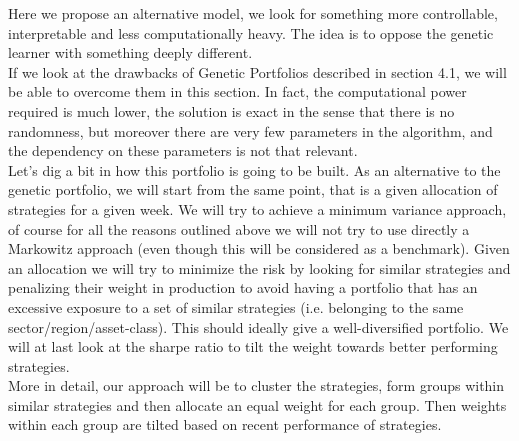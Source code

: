 Here we propose an alternative model, we look for something more controllable, interpretable and less computationally heavy. The idea is to oppose the genetic learner with something deeply different.\\
If we look at the drawbacks of Genetic Portfolios described in section 4.1, we will be able to overcome them in this section. In fact, the computational power required is much lower, the solution is exact in the sense that there is no randomness, but moreover there are very few parameters in the algorithm, and the dependency on these parameters is not that relevant.\\
Let's dig a bit in how this portfolio is going to be built. As an alternative to the genetic portfolio, we will start from the same point, that is a given allocation of strategies for a given week. We will try to achieve a minimum variance approach, of course for all the reasons outlined above we will not try to use directly a Markowitz approach (even though this will be considered as a benchmark). Given an allocation we will try to minimize the risk by looking for similar strategies and penalizing their weight in production to avoid having a portfolio that has an excessive exposure to a set of similar strategies (i.e. belonging to the same sector/region/asset-class). This should ideally give a well-diversified portfolio. We will at last look at the sharpe ratio to tilt the weight towards better performing strategies.\\
More in detail, our approach will be to cluster the strategies, form groups within similar strategies and then allocate an equal weight for each group. Then weights within each group are tilted based on recent performance of strategies.


